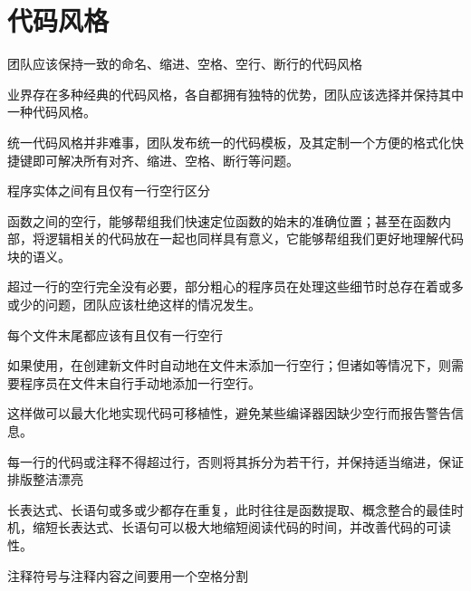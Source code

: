 \section{代码风格}

\begin{content}

\begin{regulation}
团队应该保持一致的命名、缩进、空格、空行、断行的代码风格
\end{regulation}

业界存在多种经典的代码风格，各自都拥有独特的优势，团队应该选择并保持其中一种代码风格。

\begin{enum}
\end{enum}

统一代码风格并非难事，团队发布统一的代码模板，及其定制一个方便的格式化快捷键即可解决所有对齐、缩进、空格、断行等问题。

\begin{regulation}
程序实体之间有且仅有一行空行区分
\end{regulation}

函数之间的空行，能够帮组我们快速定位函数的始末的准确位置；甚至在函数内部，将逻辑相关的代码放在一起也同样具有意义，它能够帮组我们更好地理解代码块的语义。

超过一行的空行完全没有必要，部分粗心的程序员在处理这些细节时总存在着或多或少的问题，团队应该杜绝这样的情况发生。

\begin{regulation}
每个文件末尾都应该有且仅有一行空行
\end{regulation}

如果使用，在创建新文件时自动地在文件末添加一行空行；但诸如等情况下，则需要程序员在文件末自行手动地添加一行空行。

这样做可以最大化地实现代码可移植性，避免某些编译器因缺少空行而报告警告信息。

\begin{regulation}
每一行的代码或注释不得超过行，否则将其拆分为若干行，并保持适当缩进，保证排版整洁漂亮
\end{regulation}

长表达式、长语句或多或少都存在重复，此时往往是函数提取、概念整合的最佳时机，缩短长表达式、长语句可以极大地缩短阅读代码的时间，并改善代码的可读性。

\begin{regulation}
注释符号与注释内容之间要用一个空格分割
\end{regulation}


\end{content}
